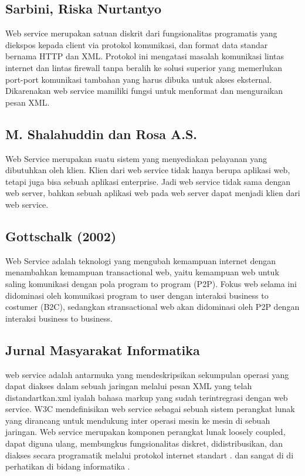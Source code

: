 \documentclass[12pt]{journal}
\begin{document}
\subsection{Sarbini, Riska Nurtantyo}

Web service merupakan satuan diskrit dari fungsionalitas programatis yang diekspos 
kepada client via protokol komunikasi, dan format data standar bernama HTTP dan 
XML. Protokol ini mengatasi masalah komunikasi lintas internet dan lintas 
firewall tanpa beralih ke solusi superior yang memerlukan port-port komunikasi 
tambahan yang harus dibuka untuk akses eksternal. Dikarenakan web service mamiliki fungsi untuk menformat dan menguraikan pesan XML\cite{sarbini2015pengembangan}. 

\subsection{M. Shalahuddin dan Rosa A.S.}

Web Service merupakan suatu sistem yang menyediakan pelayanan yang dibutuhkan oleh klien. Klien dari web service tidak hanya berupa aplikasi web, tetapi juga bisa sebuah aplikasi enterprise. Jadi web service tidak sama dengan web server, bahkan sebuah aplikasi web pada web server dapat menjadi klien dari web service\cite{inayah2014aplikasi}.

\subsection{Gottschalk (2002)}

Web Service adalah teknologi yang mengubah kemampuan internet dengan menambahkan kemampuan transactional web, yaitu kemampuan web untuk saling komunikasi dengan pola program to program (P2P). Fokus web selama ini didominasi oleh komunikasi program to user dengan interaksi business to costumer (B2C), sedangkan stransactional web akan didominasi oleh P2P dengan interaksi business to business\cite{fauziah2014aplikasi}.

\subsection{Jurnal Masyarakat Informatika}

web service adalah antarmuka yang mendeskripsikan sekumpulan operasi yang dapat diakses dalam sebuah jaringan melalui pesan XML yang telah distandartkan.xml iyalah bahasa markup yang sudah terintregrasi dengan web service. W3C mendefinisikan web service sebagai sebuah sistem perangkat lunak yang dirancang untuk mendukung inter operasi mesin ke mesin di sebuah jaringan.  Web service merupakan komponen perangkat lunak loosely coupled, dapat diguna ulang, membungkus fungsionalitas diskret, didistribusikan, dan diakses secara programatik melalui protokol internet standart . dan sangat di di perhatikan di bidang informatika \cite{saputra2integrasi}.
\end{document}

